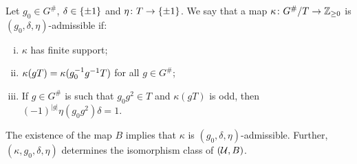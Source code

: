 \begin{defi}
    Let $g_0 \in G^\#$, $\delta \in \{ \pm 1 \}$ and $\eta\colon T \to \{ \pm 1 \}$. 
    We say that a map $\kappa\colon G^\#/T \to \mathbb{Z}_{\geq 0}$ is $(g_0, \delta, \eta)$-admissible if:
    \begin{enumerate}[(i)]
        \item $\kappa$ has finite support; \label{item:kappa-finite-support}
        \item $\kappa(gT) = \kappa(g_0^{-1} g^{-1} T)$ for all $g\in G^\#$; \label{item:kappa-duality}
        \item If $g\in G^\#$ is such that $g_0 g^2 \in T$ and $\kappa (gT)$ is odd, then $(-1)^{|g|} \eta (g_0 g^2) \delta = 1$. \label{item:kappa-parity}
    \end{enumerate}
\end{defi}

\begin{lemma}
    
\end{lemma}

\begin{prop}
    The existence of the map $B$ implies that $\kappa$ is $(g_0, \delta, \eta)$-admissible. 
    Further, $(\kappa, g_0, \delta, \eta)$ determines the isomorphism class of $(\mathcal U, B)$.
\end{prop}

